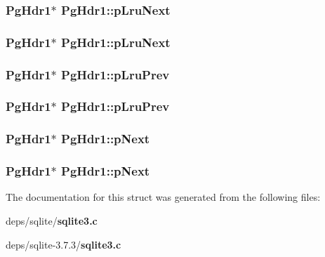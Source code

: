 \subsubsection{\setlength{\rightskip}{0pt plus 5cm}\bf{Pg\-Hdr1}$\ast$ \bf{Pg\-Hdr1::p\-Lru\-Next}}\label{structPgHdr1_5d11f15f49c72fd67f465da12dc2dab8}


\subsubsection{\setlength{\rightskip}{0pt plus 5cm}\bf{Pg\-Hdr1}$\ast$ \bf{Pg\-Hdr1::p\-Lru\-Next}}\label{structPgHdr1_5d11f15f49c72fd67f465da12dc2dab8}


\subsubsection{\setlength{\rightskip}{0pt plus 5cm}\bf{Pg\-Hdr1}$\ast$ \bf{Pg\-Hdr1::p\-Lru\-Prev}}\label{structPgHdr1_24bcc3e6d836fdba5edd60c75abd6867}


\subsubsection{\setlength{\rightskip}{0pt plus 5cm}\bf{Pg\-Hdr1}$\ast$ \bf{Pg\-Hdr1::p\-Lru\-Prev}}\label{structPgHdr1_24bcc3e6d836fdba5edd60c75abd6867}


\subsubsection{\setlength{\rightskip}{0pt plus 5cm}\bf{Pg\-Hdr1}$\ast$ \bf{Pg\-Hdr1::p\-Next}}\label{structPgHdr1_6a88edb94f436219caf3680ed5a57ad8}


\subsubsection{\setlength{\rightskip}{0pt plus 5cm}\bf{Pg\-Hdr1}$\ast$ \bf{Pg\-Hdr1::p\-Next}}\label{structPgHdr1_6a88edb94f436219caf3680ed5a57ad8}




The documentation for this struct was generated from the following files:\begin{CompactItemize}
\item 
deps/sqlite/\bf{sqlite3.c}\item 
deps/sqlite-3.7.3/\bf{sqlite3.c}\end{CompactItemize}
